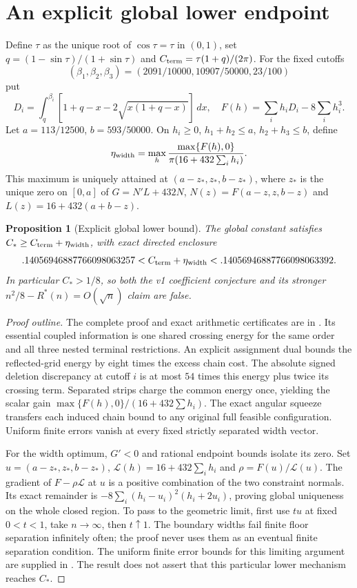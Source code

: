 \documentclass[11pt]{article}
\newtheorem{proposition}[theorem]{Proposition}
\theoremstyle{definition}\newtheorem{definition}[theorem]{Definition}
\theoremstyle{remark}\newtheorem{remark}[theorem]{Remark}
\newcommand{\Rstar}{R^\ast}
\newcommand{\CC}{C_\ast}
\begin{document}
\section{An explicit global lower endpoint}

Define $\tau$ as the unique root of $\cos\tau=\tau$ in $(0,1)$, set
$q=(1-\sin\tau)/(1+\sin\tau)$ and
$C_{\rm term}=\tau(1+q)/(2\pi)$.
For the fixed cutoffs
\[
 (\beta_1,\beta_2,\beta_3)=(2091/10000,10907/50000,23/100)
\]
put
\[
 D_i=\int_q^{\beta_i}[1+q-x-2\sqrt{x(1+q-x)}]\,dx,
 \quad F(h)=\sum_i h_iD_i-8\sum_i h_i^3.
\]
Let $a=113/12500$, $b=593/50000$. On
$h_i\ge0$, $h_1+h_2\le a$, $h_2+h_3\le b$, define
\[
 \eta_{\rm width}=\max_h
 \frac{\max\{F(h),0\}}{\pi(16+432\sum_i h_i)}.
\]
This maximum is uniquely attained at $(a-z_*,z_*,b-z_*)$, where $z_*$
is the unique zero on $[0,a]$ of $G=N'L+432N$,
$N(z)=F(a-z,z,b-z)$ and $L(z)=16+432(a+b-z)$.

\begin{proposition}[Explicit global lower bound]\label{prop:lower}
The global constant satisfies $\CC\ge C_{\rm term}+\eta_{\rm width}$,
with exact directed enclosure
\[
 .14056946887766098063257
 < C_{\rm term}+\eta_{\rm width}
 < .14056946887766098063392.
\]
In particular $\CC>1/8$, so both the v1 coefficient conjecture and its
stronger $n^2/8-\Rstar(n)=O(\sqrt n)$ claim are false.
\end{proposition}
\begin{proof}[Proof outline]
The complete proof and exact arithmetic certificates are in \cite{lower}.
Its essential coupled information is one shared crossing energy for the
same order and all three nested terminal restrictions. An explicit assignment
dual bounds the reflected-grid energy by eight times the excess chain cost.
The absolute signed deletion discrepancy at cutoff $i$ is at most $54$
times this energy plus twice its crossing term. Separated strips charge
the common energy once, yielding
the scalar gain $\max\{F(h),0\}/(16+432\sum h_i)$.
The exact angular squeeze transfers each induced chain bound to any original
full feasible configuration. Uniform finite errors vanish at every fixed
strictly separated width vector.

For the width optimum, $G'<0$ and rational endpoint bounds isolate its zero.
Set $u=(a-z_*,z_*,b-z_*)$, $\mathcal L(h)=16+432\sum_i h_i$ and
$\rho=F(u)/\mathcal L(u)$. The gradient of $F-\rho\mathcal L$ at $u$ is a positive
combination of the two constraint normals. Its exact remainder is
$-8\sum_i(h_i-u_i)^2(h_i+2u_i)$, proving global uniqueness on the whole
closed region. To pass to the geometric limit, first use $tu$ at fixed
$0<t<1$, take $n\to\infty$, then $t\uparrow1$. The boundary
widths fail finite floor separation infinitely often; the proof never uses
them as an eventual finite separation condition. The uniform finite error bounds for this
limiting argument are supplied in \cite{lower}. The result does not assert
that this particular lower mechanism reaches $\CC$.
\end{proof}
\end{document}
